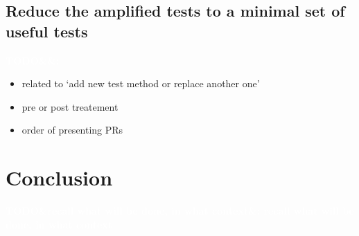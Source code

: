 \documentclass[11pt]{sdm}
\newcommand{\todo}[1]{\colorbox{Red!75}{\textcolor{white}{\textbf{TODO\ifx&#1&\else: #1\fi}}}}
\begin{document}
\subsection{Reduce the amplified tests to a minimal set of useful tests}
\label{minimal}
\todo{}

\begin{itemize}
  \item related to `add new test method or replace another one'
  \item pre or post treatement
  \item order of presenting PRs
\end{itemize}


\section*{Conclusion}
\label{conclu}
\todo{recall what will be done, in what context}




\end{document}
